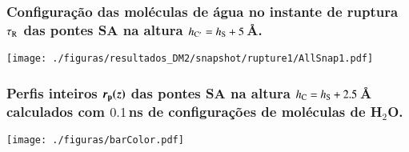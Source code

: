 \documentclass[8pt]{beamer}
\begin{document}
\begin{frame}
\frametitle{\textbf{Configuração das moléculas de água} no instante de ruptura $\tau_{\rm R}$ das pontes SA na altura $h_{\rm C'}=h_{\rm S}+5$\,\AA.}
	\begin{center}
  	   \texttt{[image: ./figuras/resultados\_DM2/snapshot/rupture1/AllSnap1.pdf]}   
	\end{center}
	\begin{center}
	\end{center}
\end{frame}

\begin{frame}
\frametitle{\textbf{Perfis inteiros $\boldsymbol{r_{\rm p}(z)}$} das pontes SA na altura $h_{\rm C}=h_{\rm S}+2.5$\,\AA\,\, calculados com $0.1$\,ns de configurações de moléculas de H$_2$O.}
	\begin{center}

  	   \vspace{0.1cm}
  	   \texttt{[image: ./figuras/barColor.pdf]}     	   
	\end{center}	
\end{frame}
\end{document}
